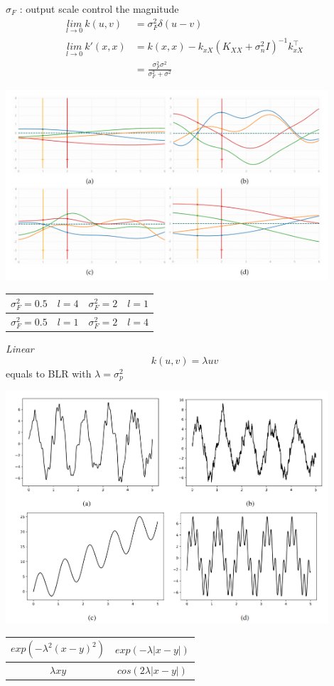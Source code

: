 \documentclass[landscape,a0paper,fontscale=0.285]{baposter} %
\begin{document}
\begin{poster}
{$\sigma_F$ : output scale  control  the magnitude
$$
\begin{aligned}
\underset{l\rightarrow 0}{lim}~k(u,v) &= \sigma_F^2\delta(u-v)\\
\underset{l\rightarrow 0}{lim}~k'(x,x) &= k(x,x) - k_{xX}(K_{XX}+\sigma_n^2 I)^{-1}k_{xX}^\top \\
&= \frac{\sigma_F^2\sigma^2}{\sigma_F^2 + \sigma^2}
\end{aligned}
$$
\begin{center}
\includegraphics[width=0.9\textwidth, trim={0cm 3cm 0 2cm},clip]{figures/9ZdGX6UqMPl2WkR.png}
    \begin{tabular}{c | c}
         $\sigma_F^2=0.5\quad l=4$ & $\sigma_F^2=2\quad l=1$ \\\hline
         $\sigma_F^2=0.5\quad l=1$ & $\sigma_F^2=2\quad l=4$
    \end{tabular}
\end{center}

\textit{Linear}\vspace{-0.3cm}
$$
k(u,v) = \lambda uv
$$
equals to BLR with $\lambda  = \sigma_p^2$

\begin{center}
    

\includegraphics[width=0.9\textwidth,trim={0cm 3cm 0 2cm},clip]{figures/73sxNuLMZocVWTp.png}
    \begin{tabular}{c | c}
         $exp(-\lambda^2(x-y)^2)$ & $exp(-\lambda|x-y|)$ \\\hline
         $\lambda xy$ & $cos(2\lambda |x-y|)$
    \end{tabular}
\end{center}






}
\end{poster}
\end{document}
